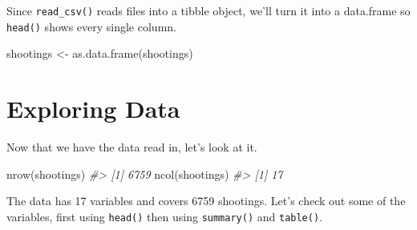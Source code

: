 \documentclass[
]{krantz}
\makeatletter
\newenvironment{Shaded}{\begin{snugshade}}{\end{snugshade}}
\newcommand{\CommentTok}[1]{\textcolor[rgb]{0.37,0.37,0.37}{\textit{#1}}}
\newcommand{\FunctionTok}[1]{\textcolor[rgb]{0,0,0}{#1}}
\newcommand{\NormalTok}[1]{#1}
\newcommand{\OtherTok}[1]{\textcolor[rgb]{0.37,0.37,0.37}{#1}}
\newenvironment{kframe}{%
\medskip{}
\setlength{\fboxsep}{.8em}
 \def\at@end@of@kframe{}%
 \ifinner\ifhmode%
  \def\at@end@of@kframe{\end{minipage}}%
  \begin{minipage}{\columnwidth}%
 \fi\fi%
 \def\FrameCommand##1{\hskip\@totalleftmargin \hskip-\fboxsep
 \colorbox{shadecolor}{##1}\hskip-\fboxsep
     \hskip-\linewidth \hskip-\@totalleftmargin \hskip\columnwidth}%
 \MakeFramed {\advance\hsize-\width
   \@totalleftmargin\z@ \linewidth\hsize
   \@setminipage}}%
 {\par\unskip\endMakeFramed%
 \at@end@of@kframe}
\renewenvironment{Shaded}{\begin{kframe}}{\end{kframe}}
\makeatother
\begin{document}
Since \texttt{read\_csv()} reads files into a tibble object, we'll turn it into a data.frame so \texttt{head()} shows every single column.

\begin{Shaded}
\begin{Highlighting}[]
\NormalTok{shootings }\OtherTok{\textless{}{-}} \FunctionTok{as.data.frame}\NormalTok{(shootings)}
\end{Highlighting}
\end{Shaded}

\hypertarget{exploring-data}{%
\section{Exploring Data}\label{exploring-data}}

Now that we have the data read in, let's look at it.

\begin{Shaded}
\begin{Highlighting}[]
\FunctionTok{nrow}\NormalTok{(shootings)}
\CommentTok{\#\textgreater{} [1] 6759}
\FunctionTok{ncol}\NormalTok{(shootings)}
\CommentTok{\#\textgreater{} [1] 17}
\end{Highlighting}
\end{Shaded}

The data has 17 variables and covers 6759 shootings. Let's check out some of the variables, first using \texttt{head()} then using \texttt{summary()} and \texttt{table()}.
\end{document}
